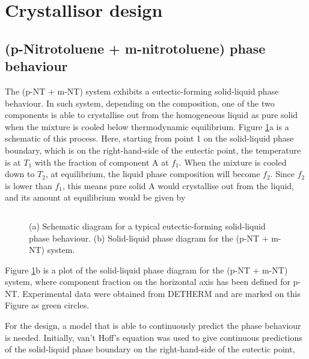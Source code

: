 \section{Crystallisor design}

\subsection{(p-Nitrotoluene + m-nitrotoluene) phase behaviour}

The (p-NT + m-NT) system exhibits a eutectic-forming solid-liquid phase behaviour. In such system, depending on the composition, one of the two components is able to crystallise out from the homogeneous liquid as pure solid when the mixture is cooled below thermodynamic equilibrium. \cite{seader_separation_2011} Figure \ref{fig:eutectic schematic}a is a schematic of this process. Here, starting from point 1 on the solid-liquid phase boundary, which is on the right-hand-side of the eutectic point, the temperature is at $T_1$ with the fraction of component A at $f_1$. When the mixture is cooled down to $T_2$, at equilibrium, the liquid phase composition will become $f_2$. Since $f_2$ is lower than $f_1$, this means pure solid A would crystallise out from the liquid, and its amount at equilibrium would be given by

\begin{equation}
    
\end{equation}



\begin{figure}[h]
    \centering
    
    \caption{(a) Schematic diagram for a typical eutectic-forming solid-liquid phase behaviour. (b) Solid-liquid phase diagram for the (p-NT + m-NT) system.}
    \label{fig:eutectic schematic}
\end{figure}

Figure \ref{fig:eutectic schematic}b is a plot of the solid-liquid phase diagram for the (p-NT + m-NT) system, where component fraction on the horizontal axis has been defined for p-NT. Experimental data were obtained from DETHERM and are marked on this Figure as green circles. 

For the design, a model that is able to continuously predict the phase behaviour is needed. Initially, van't Hoff's equation was used to give continuous predictions of the solid-liquid phase boundary on the right-hand-side of the eutectic point,

